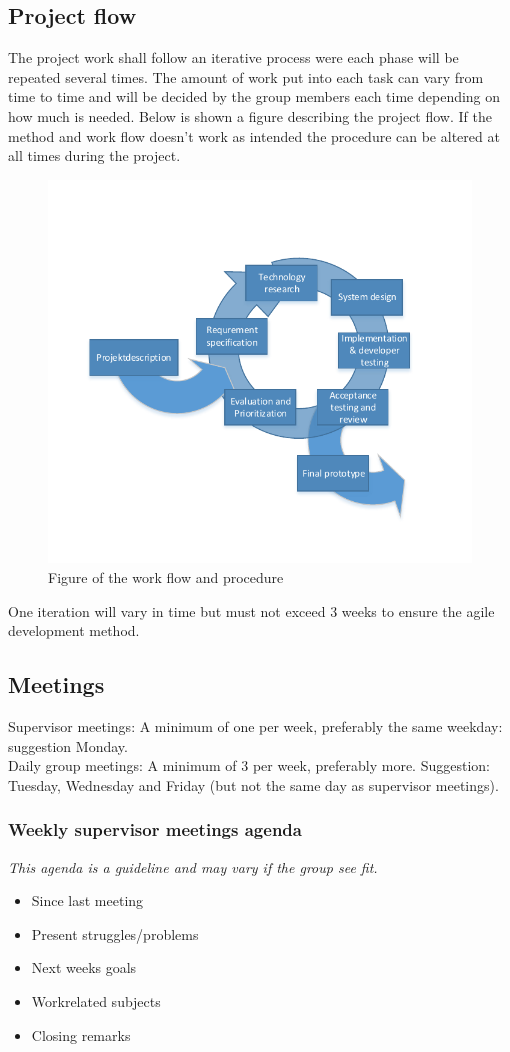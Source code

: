 \subsection{Project flow}
The project work shall follow an iterative process were each phase will be repeated several times. The amount of work put into each task can vary from time to time and will be decided by the group members each time depending on how much is needed. Below is shown a figure describing the project flow. If the method and work flow doesn't work as intended the procedure can be altered at all times during the project.
\begin{figure}[H]
\centering
\includegraphics[width=.8\textwidth]{billeder/iteration_vector}
\caption{Figure of the work flow and procedure}
\end{figure}
One iteration will vary in time but must not exceed 3 weeks to ensure the agile development method.\\

\subsection{Meetings}
Supervisor meetings: A minimum of one per week, preferably the same weekday: suggestion Monday.\\
Daily group meetings: A minimum of 3 per week, preferably more. Suggestion: Tuesday, Wednesday and Friday (but not the same day as supervisor meetings).

\subsubsection{Weekly supervisor meetings agenda}
\textit{This agenda is a guideline and may vary if the group see fit.}
\begin{itemize}
\item Since last meeting
\item Present struggles/problems
\item Next weeks goals
\item Workrelated subjects
\item Closing remarks
\end{itemize}


